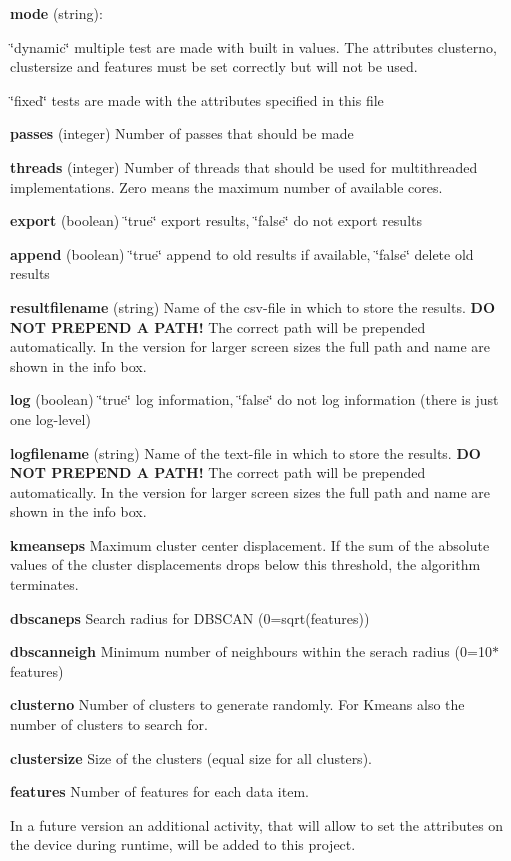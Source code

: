 \begin{DoxyItemize}
\item {\bfseries mode} (string)\+:
\begin{DoxyItemize}
\item \char`\"{}dynamic\char`\"{} multiple test are made with built in values. The attributes \textquotesingle{}clusterno\textquotesingle{}, \textquotesingle{}clustersize\textquotesingle{} and \textquotesingle{}features\textquotesingle{} must be set correctly but will not be used.
\item \char`\"{}fixed\char`\"{} tests are made with the attributes specified in this file
\end{DoxyItemize}
\item {\bfseries passes} (integer) Number of passes that should be made
\item {\bfseries threads} (integer) Number of threads that should be used for multithreaded implementations. Zero means the maximum number of available cores.
\item {\bfseries export} (boolean) \char`\"{}true\char`\"{} export results, \char`\"{}false\char`\"{} do not export results
\item {\bfseries append} (boolean) \char`\"{}true\char`\"{} append to old results if available, \char`\"{}false\char`\"{} delete old results
\item {\bfseries resultfilename} (string) Name of the csv-\/file in which to store the results. {\bfseries DO N\+OT P\+R\+E\+P\+E\+ND A P\+A\+T\+H!} The correct path will be prepended automatically. In the version for larger screen sizes the full path and name are shown in the info box.
\item {\bfseries log} (boolean) \char`\"{}true\char`\"{} log information, \char`\"{}false\char`\"{} do not log information (there is just one log-\/level)
\item {\bfseries logfilename} (string) Name of the text-\/file in which to store the results. {\bfseries DO N\+OT P\+R\+E\+P\+E\+ND A P\+A\+T\+H!} The correct path will be prepended automatically. In the version for larger screen sizes the full path and name are shown in the info box.
\item {\bfseries kmeanseps} Maximum cluster center displacement. If the sum of the absolute values of the cluster displacements drops below this threshold, the algorithm terminates.
\item {\bfseries dbscaneps} Search radius for D\+B\+S\+C\+AN (0=sqrt(features))
\item {\bfseries dbscanneigh} Minimum number of neighbours within the serach radius (0=10$\ast$features)
\item {\bfseries clusterno} Number of clusters to generate randomly. For Kmeans also the number of clusters to search for.
\item {\bfseries clustersize} Size of the clusters (equal size for all clusters).
\item {\bfseries features} Number of features for each data item.
\end{DoxyItemize}

In a future version an additional activity, that will allow to set the attributes on the device during runtime, will be added to this project. 